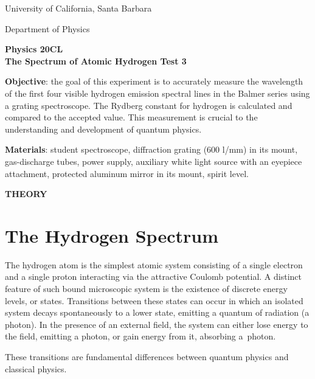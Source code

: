 \documentclass[12pt]{article}
\begin{document}

\hfil {\large University of California, Santa Barbara} \hfil

\vspace{0.1in}

\hfil {\large Department of Physics}\hfil

\normalfont

\begin{center}
    \LARGE \bfseries
    Physics 20CL\\
    The Spectrum of Atomic Hydrogen Test 3
\end{center}

\textbf{Objective}: the goal of this experiment is to accurately measure the wavelength of the first four visible hydrogen emission spectral lines in the Balmer series using a grating spectroscope. The Rydberg constant for hydrogen is calculated and compared to the accepted value. This measurement is crucial to the understanding and development of quantum physics.

\textbf{Materials}: student spectroscope, diffraction grating (600 l/mm) in its mount, gas-discharge tubes, power supply, auxiliary white light source with an eyepiece attachment, protected aluminum mirror in its mount, spirit level.

\vspace{0.3in}

\hfil \textbf{\Large THEORY} \hfil

\vspace{-0.1in}

\section{The Hydrogen Spectrum}
The hydrogen atom is the simplest atomic system consisting of a single electron and a single proton interacting via the attractive Coulomb potential. A distinct feature of such bound microscopic system is the existence of discrete energy levels, or states. Transitions between these states can occur in which an isolated system decays spontaneously to a lower state, emitting a quantum of radiation (a photon). In the presence of an external field, the system can either lose energy to the field, emitting a photon, or gain energy from it, absorbing a~photon.

These transitions are fundamental differences between quantum physics and classical physics. 
\end{document}
